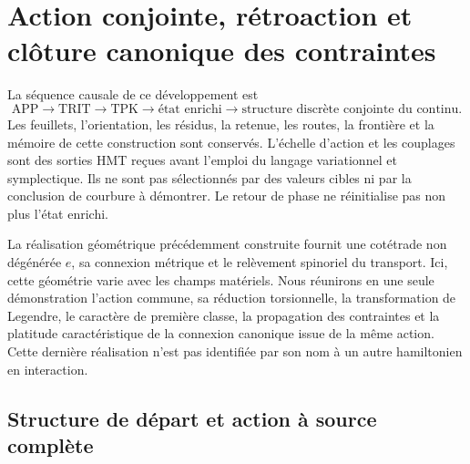 \section{Action conjointe, rétroaction et clôture canonique des contraintes}
\label{hmtcuatro:accion-retroaccion-restricciones}

La séquence causale de ce développement est
\[
 \mathrm{APP}\longrightarrow\mathrm{TRIT}\longrightarrow\mathrm{TPK}
 \longrightarrow\text{état enrichi}
 \longrightarrow\text{structure discrète conjointe du continu}.
\]
Les feuillets, l’orientation, les résidus, la retenue, les routes, la frontière et la mémoire de cette construction sont conservés. L’échelle d’action et les couplages sont des sorties HMT reçues avant l’emploi du langage variationnel et symplectique. Ils ne sont pas sélectionnés par des valeurs cibles ni par la conclusion de courbure à démontrer. Le retour de phase ne réinitialise pas non plus l’état enrichi.

La réalisation géométrique précédemment construite fournit une cotétrade non dégénérée \(e\), sa connexion métrique et le relèvement spinoriel du transport. Ici, cette géométrie varie avec les champs matériels. Nous réunirons en une seule démonstration l’action commune, sa réduction torsionnelle, la transformation de Legendre, le caractère de première classe, la propagation des contraintes et la platitude caractéristique de la connexion canonique issue de la même action. Cette dernière réalisation n’est pas identifiée par son nom à un autre hamiltonien en interaction.

\subsection{Structure de départ et action à source complète}
\label{hmtcuatro:datos-accion-total}


